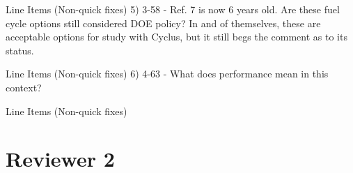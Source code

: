 \documentclass[answers,11pt]{exam}
\begin{document}
\begin{questions}
\question Line Items (Non-quick fixes)
5) 3-58 - Ref. 7 is now 6 years old. Are these fuel cycle options still considered DOE policy? In and of
themselves, these are acceptable options for study with Cyclus, but it still begs the comment as to its
status.

\question Line Items (Non-quick fixes)
6) 4-63 - What does performance mean in this context?

\question Line Items (Non-quick fixes)

\begin{solution}
\end{solution}

\end{questions}

\section*{Reviewer 2}
\end{document}

